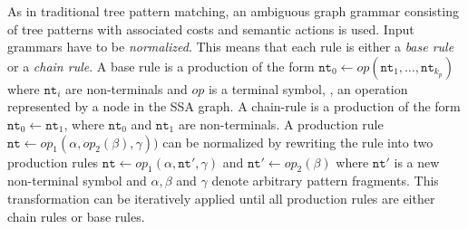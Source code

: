 As in traditional tree pattern matching, an ambiguous graph grammar
consisting of tree patterns with associated costs and semantic actions
is used. Input grammars have to be \emph{normalized}. This means that
each rule is either a \emph{base rule} or a \emph{chain rule}. A
base rule is a production of the form $\texttt{nt}_0 \leftarrow
\textit{op} ( \texttt{nt}_1, \dots, \texttt{nt}_{k_p} )$ where
$\texttt{nt}_i$ are non-terminals and $\textit{op}$ is a terminal
symbol, \ie, an operation represented by a node in the SSA graph. A
chain-rule is a production of the form $\texttt{nt}_0 \leftarrow
\texttt{nt}_1$, where $\texttt{nt}_0$ and $\texttt{nt}_1$ are
non-terminals.  A production rule $\texttt{nt} \leftarrow
\textit{op}_1 ( \alpha, \textit{op}_2 (\beta), \gamma))$ can be
normalized by rewriting the rule into two production rules
$\texttt{nt} \leftarrow \textit{op}_1 ( \alpha, \texttt{nt}' ,
\gamma)$ and $\texttt{nt}' \leftarrow \textit{op}_2 ( \beta)$ where
$\texttt{nt}'$ is a new non-terminal symbol and $\alpha,\beta$ and
$\gamma$ denote arbitrary pattern fragments.  This transformation can
be iteratively applied until all production rules are either chain
rules or base rules.


